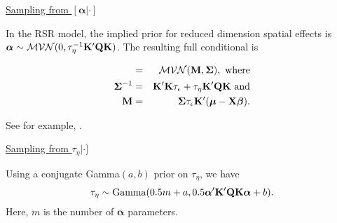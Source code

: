 \documentclass[12pt,fleqn]{article}
\begin{document}
\begin{flushleft}
\underline{Sampling from $[\boldsymbol{\alpha}|\cdot]$}

In the RSR model, the implied prior for reduced dimension spatial effects is $\boldsymbol{\alpha} \sim \mathcal{MVN}(0,\tau_\eta^{-1}{\bf K}^\prime {\bf Q} {\bf K})$.  The resulting full conditional is
\begin{linenomath*}
\begin{eqnarray*}
   [\boldsymbol{\alpha} | \cdot] & = & \mathcal{MVN}({\bf M},\boldsymbol{\Sigma}), \text{ where} \\
   \boldsymbol{\Sigma}^{-1} & = & {\bf K}^\prime {\bf K}\tau_\epsilon+\tau_\eta{\bf K}^\prime {\bf Q} {\bf K} \text{ and} \\
    {\bf M} & = & \boldsymbol{\Sigma} \tau_\epsilon {\bf K}^\prime (\boldsymbol{\mu} - {\bf X} \boldsymbol{\beta}).
\end{eqnarray*}
\end{linenomath*}
See for example, \citet{ConnEtAl2014}.

\underline{Sampling from $\tau_\eta|\cdot]$}

Using a conjugate Gamma$(a,b)$ prior on $\tau_\eta$, we have
  \begin{equation*}
  \tau_{\eta} \sim {\rm Gamma}(0.5m + a,0.5 \boldsymbol{\alpha}^\prime
  {\bf K}^\prime {\bf Q} {\bf K}\boldsymbol{\alpha}+b).
  \end{equation*}
  Here, $m$ is the number of $\boldsymbol{\alpha}$ parameters.\\



\end{flushleft}
\end{document}
